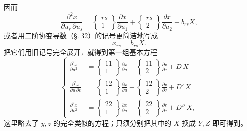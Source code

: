 因而
\[
 \frac{\partial^2x}{\partial u_r\,\partial u_s}
 =
 \left\{\begin{matrix}rs\\1\end{matrix}\right\}\frac{\partial x}{\partial u_1}
 +
 \left\{\begin{matrix}rs\\2\end{matrix}\right\}\frac{\partial x}{\partial u_2}
 +b_{rs}X,
\]
或者用二阶协变导数（\S. 32）的记号更简洁地写成
\[
 x_{rs}=b_{rs}X.
\]
把它们用旧记号完全展开，就得到第一组基本方程
\begin{equation}\tag{I}
\left\{
\begin{aligned}
 \frac{\partial^2x}{\partial u^2}
 &=
 \left\{\begin{matrix}11\\1\end{matrix}\right\}\frac{\partial x}{\partial u}
 +\left\{\begin{matrix}11\\2\end{matrix}\right\}\frac{\partial x}{\partial v}
 +D\,X\\
 \frac{\partial^2x}{\partial u\,\partial v}
 &=
 \left\{\begin{matrix}12\\1\end{matrix}\right\}\frac{\partial x}{\partial u}
 +\left\{\begin{matrix}12\\2\end{matrix}\right\}\frac{\partial x}{\partial v}
 +D'\,X\\
 \frac{\partial^2x}{\partial v^2}
 &=
 \left\{\begin{matrix}22\\1\end{matrix}\right\}\frac{\partial x}{\partial u}
 +\left\{\begin{matrix}22\\2\end{matrix}\right\}\frac{\partial x}{\partial v}
 +D''\,X,
\end{aligned}\right.
\end{equation}
这里略去了 \(y,z\) 的完全类似的方程；只须分别把其中的 \(X\) 换成 \(Y,Z\) 即可得到。

